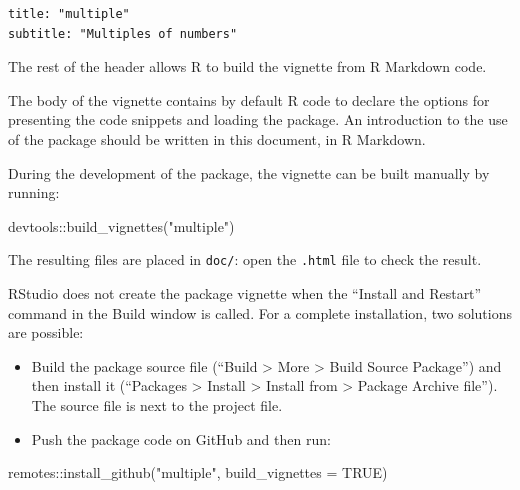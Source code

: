 \documentclass[
  12pt,
  american,
  a4paper,
  extrafontsizes,onecolumn,openright
  ]{memoir}
\newenvironment{Shaded}{\begin{snugshade}}{\end{snugshade}}
\newcommand{\AttributeTok}[1]{\textcolor[rgb]{0.77,0.63,0.00}{#1}}
\newcommand{\ConstantTok}[1]{\textcolor[rgb]{0.00,0.00,0.00}{#1}}
\newcommand{\FunctionTok}[1]{\textcolor[rgb]{0.00,0.00,0.00}{#1}}
\newcommand{\NormalTok}[1]{#1}
\newcommand{\SpecialCharTok}[1]{\textcolor[rgb]{0.00,0.00,0.00}{#1}}
\newcommand{\StringTok}[1]{\textcolor[rgb]{0.31,0.60,0.02}{#1}}
\providecommand{\tightlist}{%
  \setlength{\itemsep}{0pt}\setlength{\parskip}{0pt}}
\begin{document}
\begin{verbatim}
title: "multiple"
subtitle: "Multiples of numbers"
\end{verbatim}

The rest of the header allows R to build the vignette from R Markdown code.

The body of the vignette contains by default R code to declare the options for presenting the code snippets and loading the package.
An introduction to the use of the package should be written in this document, in R Markdown.

During the development of the package, the vignette can be built manually by running:

\scriptsize

\begin{Shaded}
\begin{Highlighting}[]
\NormalTok{devtools}\SpecialCharTok{::}\FunctionTok{build\_vignettes}\NormalTok{(}\StringTok{"multiple"}\NormalTok{)}
\end{Highlighting}
\end{Shaded}

\normalsize

The resulting files are placed in \texttt{doc/}: open the \texttt{.html} file to check the result.

RStudio does not create the package vignette when the \enquote{Install and Restart} command in the Build window is called.
For a complete installation, two solutions are possible:

\begin{itemize}
\tightlist
\item
  Build the package source file (\enquote{Build \textgreater{} More \textgreater{} Build Source Package}) and then install it (\enquote{Packages \textgreater{} Install \textgreater{} Install from \textgreater{} Package Archive file}).
  The source file is next to the project file.
\item
  Push the package code on GitHub and then run:
\end{itemize}

\scriptsize

\begin{Shaded}
\begin{Highlighting}[]
\NormalTok{remotes}\SpecialCharTok{::}\FunctionTok{install\_github}\NormalTok{(}\StringTok{"multiple"}\NormalTok{, }\AttributeTok{build\_vignettes =} \ConstantTok{TRUE}\NormalTok{)}
\end{Highlighting}
\end{Shaded}
\end{document}

